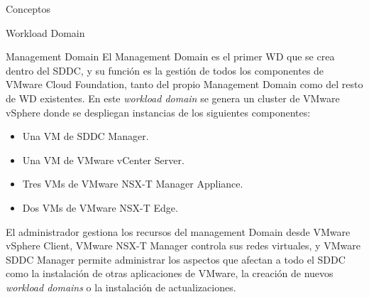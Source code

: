 \begin{section}{Conceptos}
\begin{subsection}{Workload Domain}
\begin{subsubsection}{Management Domain}
\label{subsubsec:domainManagement}
El Management Domain es el primer WD que se crea dentro del SDDC, y su función es la gestión de todos los componentes de VMware Cloud Foundation, tanto del propio Management Domain como del resto de WD existentes. En este \textit{workload domain} se genera un cluster de VMware vSphere donde se despliegan instancias de los siguientes componentes:
\begin{itemize}
  \item Una VM de SDDC Manager.
  \item Una VM de VMware vCenter Server.
  \item Tres VMs de VMware NSX-T Manager Appliance.
  \item Dos VMs de VMware NSX-T Edge.
\end{itemize}
El administrador gestiona los recursos del management Domain desde VMware vSphere Client, VMware NSX-T Manager controla sus redes virtuales, y VMware SDDC Manager permite administrar los aspectos que afectan a todo el SDDC como la instalación de otras aplicaciones de VMware, la creación de nuevos \textit{workload domains} o la instalación de actualizaciones. 


\end{subsubsection}
\end{subsection}
\end{section}
